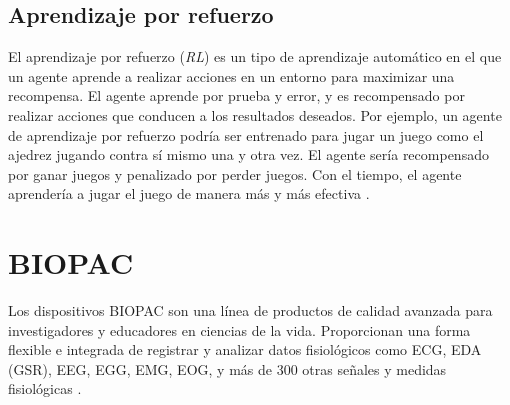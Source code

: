 \subsection{Aprendizaje por refuerzo}
El aprendizaje por refuerzo (\textit{RL}) es un tipo de aprendizaje automático en el que un agente aprende a realizar acciones en un entorno para maximizar una recompensa. El agente aprende por prueba y error, y es recompensado por realizar acciones que conducen a los resultados deseados. Por ejemplo, un agente de aprendizaje por refuerzo podría ser entrenado para jugar un juego como el ajedrez jugando contra sí mismo una y otra vez. El agente sería recompensado por ganar juegos y penalizado por perder juegos. Con el tiempo, el agente aprendería a jugar el juego de manera más y más efectiva \cite{G-Cloud_2023}.

\section{BIOPAC}
Los dispositivos BIOPAC son una línea de productos de calidad avanzada para investigadores y educadores en ciencias de la vida. Proporcionan una forma flexible e integrada de registrar y analizar datos fisiológicos como ECG, EDA (GSR), EEG, EGG, EMG, EOG, y más de 300 otras señales y medidas fisiológicas \cite{BIOPAC}.
